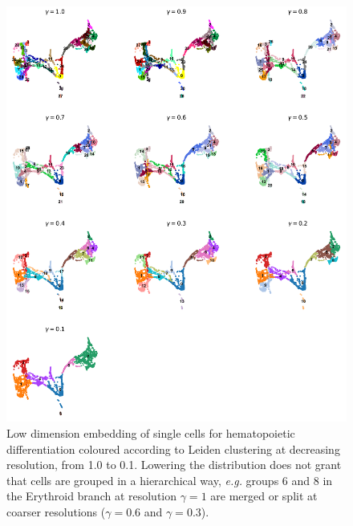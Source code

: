 \documentclass[11pt, titlepage, twoside]{article}
\begin{document}
\begin{figure}[htbp]
\centering
\includegraphics[keepaspectratio,width=\textwidth,height=0.75\textheight]{Figure_Paul15_Leiden_r.pdf}
\caption[]{Low dimension embedding of single cells for hematopoietic differentiation coloured according to Leiden clustering at decreasing resolution, from 1.0 to 0.1. Lowering the distribution does not grant that cells are grouped in a hierarchical way, \emph{e.g.} groups 6 and 8 in the Erythroid branch at resolution $\gamma=1$ are merged or split at coarser resolutions ($\gamma=0.6$ and $\gamma=0.3$).}\label{Figure_Paul15_Leiden_r}
\end{figure}
\clearpage
\end{document}
